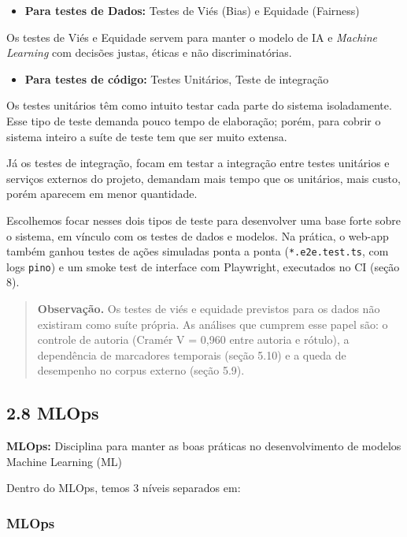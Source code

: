 \documentclass[
  brazilian,
  11pt,
]{article}
\providecommand{\tightlist}{%
  \setlength{\itemsep}{0pt}\setlength{\parskip}{0pt}}
\begin{document}
\begin{itemize}
\tightlist
\item
  \textbf{Para testes de Dados:} Testes de Viés (Bias) e Equidade (Fairness)
\end{itemize}

Os testes de Viés e Equidade servem para manter o modelo de IA e \emph{Machine Learning} com decisões justas, éticas e não discriminatórias.

\begin{itemize}
\tightlist
\item
  \textbf{Para testes de código:} Testes Unitários, Teste de integração
\end{itemize}

Os testes unitários têm como intuito testar cada parte do sistema isoladamente. Esse tipo de teste demanda pouco tempo de elaboração; porém, para cobrir o sistema inteiro a suíte de teste tem que ser muito extensa.

Já os testes de integração, focam em testar a integração entre testes unitários e serviços externos do projeto, demandam mais tempo que os unitários, mais custo, porém aparecem em menor quantidade.

Escolhemos focar nesses dois tipos de teste para desenvolver uma base forte sobre o sistema, em vínculo com os testes de dados e modelos. Na prática, o web-app também ganhou testes de ações simuladas ponta a ponta (\texttt{*.e2e.test.ts}, com logs \texttt{pino}) e um smoke test de interface com Playwright, executados no CI (seção 8).

\begin{quote}
\textbf{Observação.} Os testes de viés e equidade previstos para os dados não existiram como suíte própria. As análises que cumprem esse papel são: o controle de autoria (Cramér V = 0,960 entre autoria e rótulo), a dependência de marcadores temporais (seção 5.10) e a queda de desempenho no corpus externo (seção 5.9).
\end{quote}

\subsection{2.8 MLOps}\label{mlops}

\textbf{MLOps:} Disciplina para manter as boas práticas no desenvolvimento de modelos Machine Learning (ML)

Dentro do MLOps, temos 3 níveis separados em:

\subsubsection{\texorpdfstring{\textbf{MLOps}}{MLOps}}\label{mlops-1}
\end{document}
